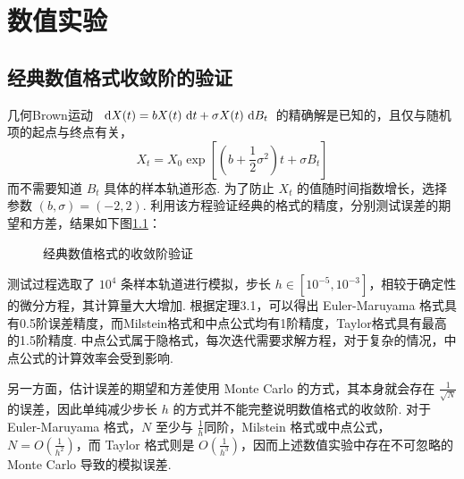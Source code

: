 \chapter{数值实验}\label{chap6}

\section{经典数值格式收敛阶的验证}
几何Brown运动 $\text{ d} X(t) = bX(t) \text{ d} t+\sigma X(t)\text{ d} B_t$ 的精确解是已知的，且仅与随机项的起点与终点有关，
\[
X_t = X_0 \exp\left[ (b+\frac12\sigma^2)t + \sigma B_t \right]
\]
而不需要知道 $B_t$ 具体的样本轨道形态. 
为了防止 $X_t$ 的值随时间指数增长，选择参数 $(b,\sigma) = (-2,2)$. 
利用该方程验证经典的格式的精度，分别测试误差的期望和方差，结果如下图\ref{fig.6.1}：

\begin{figure}[!htbp]
	\centering 
	\vspace{.2cm}
	\caption{经典数值格式的收敛阶验证}
	\label{fig.6.1}
\end{figure}

测试过程选取了 $10^4$ 条样本轨道进行模拟，步长 $h\in[10^{-5},10^{-3}]$，相较于确定性的微分方程，其计算量大大增加. 根据定理3.1，可以得出 Euler-­Maruyama 格式具有0.5阶误差精度，而Milstein格式和中点公式均有1阶精度，Taylor格式具有最高的1.5阶精度. 中点公式属于隐格式，每次迭代需要求解方程，对于复杂的情况，中点公式的计算效率会受到影响. 

另一方面，估计误差的期望和方差使用 Monte Carlo 的方式，其本身就会存在 $\frac1{\sqrt N}$ 的误差，因此单纯减少步长 $h$ 的方式并不能完整说明数值格式的收敛阶. 对于 Euler-­Maruyama 格式，$N$ 至少与 $\frac1h$同阶，Milstein 格式或中点公式，$N = O(\frac1{h^{2}})$，而 Taylor 格式则是 $O(\frac1{h^{3}})$，因而上述数值实验中存在不可忽略的 Monte Carlo 导致的模拟误差. 

